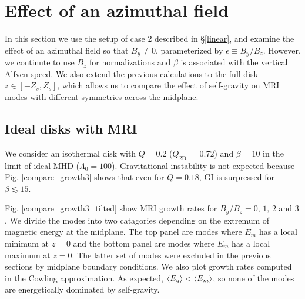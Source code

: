 \section{Effect of an azimuthal field}\label{result3}
In this section we use the setup of case 2 described in
\S\ref{linear}, and examine the effect of an azimuthal field so that
$B_y\neq 0$,   
parameterized by $\epsilon \equiv B_y/B_z$. However, we continute to
use $B_z$ for normalizations and $\beta$ is associated with the
vertical Alfven speed. We also extend the previous calculations to the
full disk $z\in[-Z_s,Z_s]$,  which allows us to compare the effect of
self-gravity on MRI modes with different symmetries across the
midplane. 

\subsection{Ideal disks with MRI} 
We consider an isothermal disk with $Q=0.2$ ($Q_\mathrm{2D}=~0.72$) and
$\beta=10$ in the limit of ideal MHD ($\Lambda_0=100$). Gravitational
instability is not expected because Fig. \ref{compare_growth3} shows
that even for $Q=0.18$, GI is surpressed for $\beta \lesssim 15$. %

Fig. \ref{compare_growth3_tilted} show MRI growth rates for
$B_y/B_z=0,\,1,\,2$ and $3$. We divide the modes into two catagories
depending on the extremum of magnetic energy at the midplane. 
The top panel are modes where $E_m$ has a local minimum at $z=0$ and 
the bottom panel are modes where $E_m$ has a local maximum at $z=0$. 
The latter set of modes were excluded in the previous sections by
midplane boundary conditions. 
We also plot growth rates computed in the Cowling
approximation. As expected,  $\langle{E_g}\rangle<\langle{E_m}\rangle$, so none of the
modes are energetically dominated by self-gravity. 


